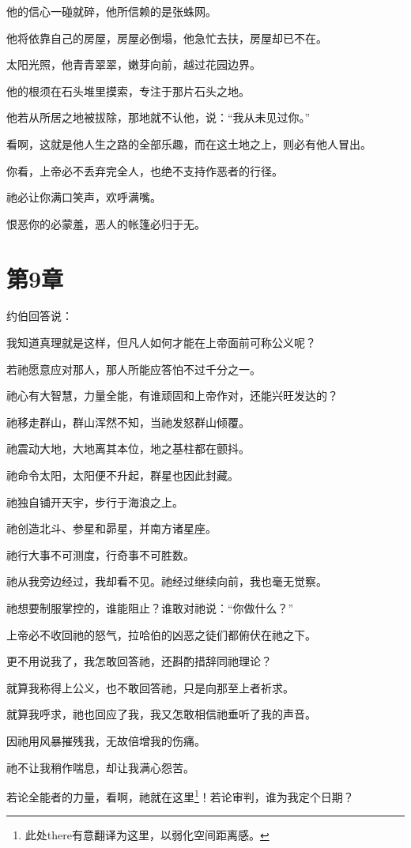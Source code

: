 \documentclass[12pt,oneside]{book}
\begin{document}
他的信心一碰就碎，他所信赖的是张蛛网。

他将依靠自己的房屋，房屋必倒塌，他急忙去扶，房屋却已不在。

太阳光照，他青青翠翠，嫩芽向前，越过花园边界。

他的根须在石头堆里摸索，专注于那片石头之地。

他若从所居之地被拔除，那地就不认他，说：“我从未见过你。”

看啊，这就是他人生之路的全部乐趣，而在这土地之上，则必有他人冒出。

你看，上帝必不丢弃完全人，也绝不支持作恶者的行径。

祂必让你满口笑声，欢呼满嘴。

恨恶你的必蒙羞，恶人的帐篷必归于无。



\chapter{第9章}
约伯回答说：

我知道真理就是这样，但凡人如何才能在上帝面前可称公义呢？

若祂愿意应对那人，那人所能应答怕不过千分之一。

祂心有大智慧，力量全能，有谁顽固和上帝作对，还能兴旺发达的？

祂移走群山，群山浑然不知，当祂发怒群山倾覆。

祂震动大地，大地离其本位，地之基柱都在颤抖。

祂命令太阳，太阳便不升起，群星也因此封藏。

祂独自铺开天宇，步行于海浪之上。

祂创造北斗、参星和昴星，并南方诸星座。

祂行大事不可测度，行奇事不可胜数。

祂从我旁边经过，我却看不见。祂经过继续向前，我也毫无觉察。

祂想要制服掌控的，谁能阻止？谁敢对祂说：“你做什么？”

上帝必不收回祂的怒气，拉哈伯的凶恶之徒们都俯伏在祂之下。

更不用说我了，我怎敢回答祂，还斟酌措辞同祂理论？

就算我称得上公义，也不敢回答祂，只是向那至上者祈求。

就算我呼求，祂也回应了我，我又怎敢相信祂垂听了我的声音。

因祂用风暴摧残我，无故倍增我的伤痛。

祂不让我稍作喘息，却让我满心怨苦。

若论全能者的力量，看啊，祂就在这里\footnote{此处there有意翻译为这里，以弱化空间距离感。}！若论审判，谁为我定个日期？
\end{document}
